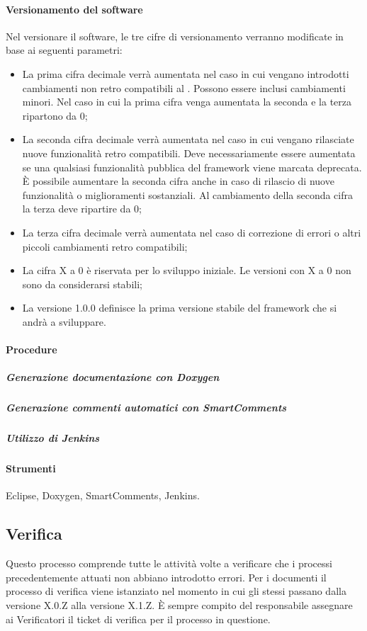 \paragraph{Versionamento del software}

Nel versionare il software, le tre cifre di versionamento verranno modificate in base ai seguenti parametri:
\begin{itemize}
\item La prima cifra decimale verrà aumentata nel caso in cui vengano introdotti cambiamenti non retro compatibili al . Possono essere inclusi cambiamenti minori. Nel caso in cui la prima cifra venga aumentata la seconda e la terza ripartono da 0;
\item La seconda cifra decimale verrà aumentata nel caso in cui vengano rilasciate nuove funzionalità retro compatibili. Deve necessariamente essere aumentata se una qualsiasi funzionalità pubblica del framework viene marcata deprecata. È possibile aumentare la seconda cifra anche in caso di rilascio di nuove funzionalità o miglioramenti sostanziali. Al cambiamento della seconda cifra la terza deve ripartire da 0;
\item La terza cifra decimale verrà aumentata nel caso di correzione di errori o altri piccoli cambiamenti retro compatibili;
\item La cifra X a 0 è riservata per lo sviluppo iniziale. Le versioni con X a 0 non sono da considerarsi stabili;
\item La versione 1.0.0 definisce la prima versione stabile del framework che si andrà a sviluppare.
\end{itemize}


\paragraph{Procedure}

\subparagraph{Generazione documentazione con Doxygen}
\subparagraph{Generazione commenti automatici con SmartComments}
\subparagraph{Utilizzo di Jenkins}



\paragraph{Strumenti}

Eclipse, Doxygen, SmartComments, Jenkins.

\subsection{Verifica}
Questo processo comprende tutte le attività volte a verificare che i processi precedentemente attuati non abbiano introdotto errori.
Per i documenti il processo di verifica viene istanziato nel momento in cui gli stessi passano dalla versione X.0.Z alla versione X.1.Z. 
È sempre compito del responsabile assegnare ai Verificatori il ticket di verifica per il processo in questione.

